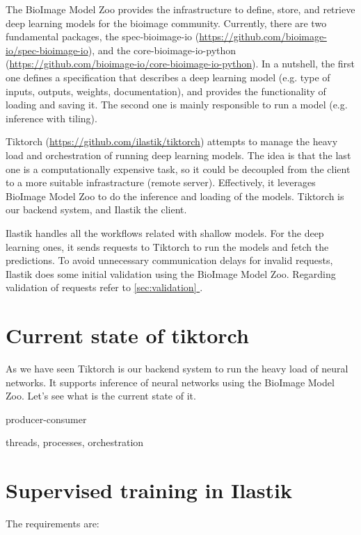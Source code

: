 \documentclass[12pt, a4paper]{article}
\newcommand*{\fullref}[1]{\hyperref[{#1}]{\ref*{#1} \nameref*{#1}}}
\begin{document}
The BioImage Model Zoo provides the infrastructure to define, store, and retrieve deep learning models for the bioimage community. Currently, there are two fundamental packages, the spec-bioimage-io (\url{https://github.com/bioimage-io/spec-bioimage-io}), and the core-bioimage-io-python (\url{https://github.com/bioimage-io/core-bioimage-io-python}). In a nutshell, the first one defines a specification that describes a deep learning model (e.g. type of inputs, outputs, weights, documentation), and provides the functionality of loading and saving it. The second one is mainly responsible to run a model (e.g. inference with tiling).

Tiktorch (\url{https://github.com/ilastik/tiktorch}) attempts to manage the heavy load and orchestration of running deep learning models. The idea is that the last one is a computationally expensive task, so it could be decoupled from the client to a more suitable infrastracture (remote server). Effectively, it leverages BioImage Model Zoo to do the inference and loading of the models. Tiktorch is our backend system, and Ilastik the client.

Ilastik handles all the workflows related with shallow models. For the deep learning ones, it sends requests to Tiktorch to run the models and fetch the predictions. To avoid unnecessary communication delays for invalid requests, Ilastik does some initial validation using the BioImage Model Zoo. Regarding validation of requests refer to \fullref{sec:validation}.



\section{Current state of tiktorch}

As we have seen Tiktorch is our backend system to run the heavy load of neural networks. It supports inference of neural networks using the  BioImage Model Zoo. Let's see what is the current state of it.

producer-consumer

threads, processes, orchestration

\section{Supervised training in Ilastik}

The requirements are:
\end{document}

